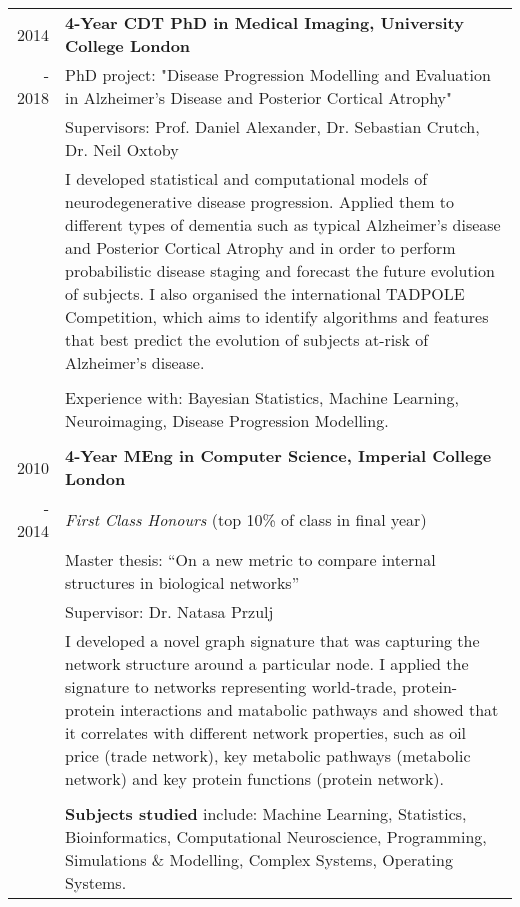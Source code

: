 \documentclass[a4paper,10pt]{article} %
\begin{document}
\begin{tabular}{r|p{15.7cm}}
2014 & \large\textbf{4-Year CDT PhD in Medical Imaging, University College London}\\
- 2018 & PhD project: "Disease Progression Modelling and Evaluation in Alzheimer's Disease and Posterior Cortical Atrophy"\\
& \small Supervisors: Prof. Daniel Alexander, Dr. Sebastian Crutch, Dr. Neil Oxtoby\\
& I developed statistical and computational models of neurodegenerative disease progression. Applied them to different types of dementia such as typical Alzheimer's disease and Posterior Cortical Atrophy and in order to perform probabilistic disease staging and forecast the future evolution of subjects. I also organised the international TADPOLE Competition, which aims to identify algorithms and features that best predict the evolution of subjects at-risk of Alzheimer's disease.\\\\

& Experience with: Bayesian Statistics, Machine Learning, Neuroimaging, Disease Progression Modelling.\\

\\
2010 & \large\textbf{4-Year MEng in Computer Science, Imperial College London}\\
- 2014 & \emph{First Class Honours} (top 10\% of class in final year) \\
& Master thesis: ``On a new metric to compare internal structures in biological
networks''\\
& \small Supervisor: Dr. Natasa Przulj\\
& I developed a novel graph signature that was capturing the network structure around a particular node. I applied the signature to networks representing world-trade, protein-protein interactions and matabolic pathways and showed that it correlates with different network properties, such as oil price (trade network), key metabolic pathways (metabolic network) and key protein functions (protein network). \\
& \\
& \textbf{Subjects studied} include: Machine Learning, Statistics, Bioinformatics, Computational Neuroscience, Programming, Simulations \& Modelling, Complex Systems, Operating Systems.\\
\end{tabular}


\end{document}
